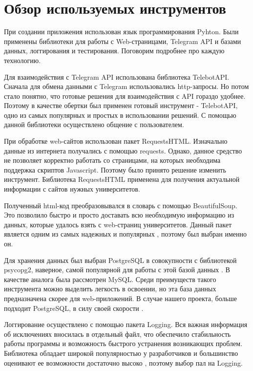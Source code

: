 \documentclass[a4paper,article,14pt]{extarticle}
\begin{document}
\section{Обзор используемых инструментов}

При создании приложения использован язык программирования Pyhton. Были применены библиотеки для работы с Web-страницами, Telegram API и базами данных, логгирования и тестирования. Поговорим подробнее про каждую технологию.

Для взаимодействия с Telegram API использована библиотека 
TelebotAPI. Сначала для обмена данными с Telegram использовались http-запросы. Но потом стало понятно, что готовые решения для взаимодействия с API гораздо удобнее. Поэтому в качестве обертки был применен готовый инструмент - TelebotAPI, одно из самых популярных и простых в использовании решений.  С помощью данной библиотеки осуществлено общение с пользователем.

При обработке web-сайтов использован пакет RequestsHTML. Изначально данные из интернета получались с помощью requests. Однако, данное средство не позволяет корректно работать со страницами, на которых необходима поддержка скриптов Javascript. Поэтому было принято решение изменить инструмент. Библиотека RequestsHTML применена для получения актуальной информации с сайтов нужных университетов.

Полученный html-код преобразовывался в словарь с помощью 
BeautifulSoup. Это позволило быстро и просто доставать всю необходимую информацию из данных, которые удалось взять с web-страниц университетов. Данный пакет является одним из самых надежных и популярных \cite{beautifulsoup}, поэтому был выбран именно он.

Для хранения данных был выбран PostgreSQL в совокупности с библиотекой psycopg2, наверное, самой популярной для работы с этой базой данных \cite{psycopg2}. В качестве аналога была рассмотрен MySQL. Среди преимуществ такого инструмента можно выделить легкость в освоении, но эта база данных предназначена скорее для web-приложений. В случае нашего проекта, больше подходит PostgreSQL, в силу своей скорости \cite{postgresql}.

Логгирование осуществлено с помощью пакета Logging. Вся важная информация об исключениях вносилась в отдельный файл, что обеспечило стабильность работы программы и возможность быстрого устранения возникающих проблем. Библиотека обладает широкой популярностью у разработчиков и большинство оценивают ее возможности достаточно высоко \cite{logging}, поэтому выбор пал на Logging.
\end{document}
